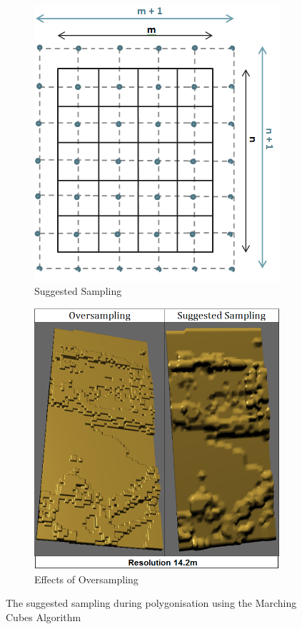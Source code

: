 \documentclass{subfiles}
\begin{document}
    \begin{figure} [h!]
    	\begin{subfigure}[t]{.49\textwidth}
    		
    		\centering
    		\includegraphics[width=.9\textwidth]{img/Sampling}
    		\caption{Suggested Sampling}
    		\label{fig:ExpectedSampling}
    	\end{subfigure} \hfill
    	\begin{subfigure}[t]{.49\textwidth}
    		\centering
    		\includegraphics[width=.9\textwidth]{img/OversamplingVsSuggestedSampling}
    		\caption{Effects of Oversampling} 
    		\label{fig:SamplingArtifacts}
    	\end{subfigure} \hfill
    	\caption[Marching Cubes Sampling]{The suggested sampling during polygonisation using the Marching Cubes Algorithm}
    	\label{fig:MCSampling}
    \end{figure}
\end{document}
